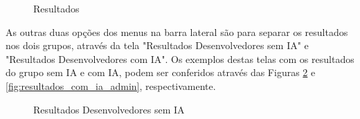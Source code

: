 \documentclass[english,brazilian]{UNISINOSartigo} %
\begin{document}
\begin{figure}[ht]
    \caption{Resultados}
    \label{fig:resultados_gerais_admin}
    \centering
    \footnotesize
    \begin{minipage}{.9\textwidth}
        \centering
    \end{minipage}
\end{figure}
\FloatBarrier

As outras duas opções dos menus na barra lateral são para separar os resultados nos dois grupos, através da tela "Resultados Desenvolvedores sem IA" e "Resultados Desenvolvedores com IA". Os exemplos destas telas com os resultados do grupo sem IA e com IA, podem ser conferidos através das Figuras \ref{fig:resultados_sem_ia_admin} e \ref{fig:resultados_com_ia_admin}, respectivamente.

\begin{figure}[ht]
    \caption{Resultados Desenvolvedores sem IA}
    \label{fig:resultados_sem_ia_admin}
    \centering
    \footnotesize
    \begin{minipage}{.9\textwidth}
        \centering
    \end{minipage}
\end{figure}
\FloatBarrier
\end{document}
